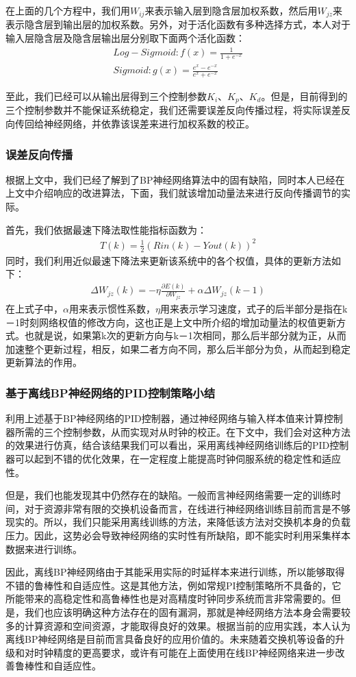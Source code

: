 在上面的几个方程中，我们用$W_{ij}$来表示输入层到隐含层加权系数，然后用$W_{jz}$来表示隐含层到输出层的加权系数。另外，对于活化函数有多种选择方式，本人对于输入层\-隐含层及隐含层\-输出层分别取下面两个活化函数：
\begin{align}
Log-Sigmoid : f(x) = \frac{1}{1 + e^{-x}} \\
Sigmoid : g(x) = \frac{e^{x} - e^{-x}}{e^{x} + e^{-x}}
\end{align}

至此，我们已经可以从输出层得到三个控制参数$K_{i}$、$K_{p}$、$K_{d}$。但是，目前得到的三个控制参数并不能保证系统稳定，我们还需要误差反向传播过程，将实际误差反向传回给神经网络，并依靠该误差来进行加权系数的校正。

\subsubsection{误差反向传播}
根据上文中，我们已经了解到了BP神经网络算法中的固有缺陷，同时本人已经在上文中介绍响应的改进算法，下面，我们就该增加动量法来进行反向传播调节的实际。

首先，我们依据最速下降法取性能指标函数为：
\begin{align}
T(k) = \frac{1}{2}(Rin(k) - Yout(k))^{2}
\end{align}
同时，我们利用近似最速下降法来更新该系统中的各个权值，具体的更新方法如下：
\begin{align}
\Delta W_{jz}(k) = -\eta \frac{\partial E(k)}{\partial W_{jz}} + \alpha \Delta W_{jz}(k-1)
\end{align}
在上式子中，$\alpha$用来表示惯性系数，$\eta$用来表示学习速度，式子的后半部分是指在k－1时刻网络权值的修改方向，这也正是上文中所介绍的增加动量法的权值更新方式。也就是说，如果第k次的更新方向与k－1次相同，那么后半部分就为正，从而加速整个更新过程，相反，如果二者方向不同，那么后半部分为负，从而起到稳定更新算法的作用。

\subsubsection{基于离线BP神经网络的PID控制策略小结}
利用上述基于BP神经网络的PID控制器，通过神经网络与输入样本值来计算控制器所需的三个控制参数，从而实现对从时钟的校正。在下文中，我们会对这种方法的效果进行仿真，结合该结果我们可以看出，采用离线神经网络训练后的PID控制器可以起到不错的优化效果，在一定程度上能提高时钟伺服系统的稳定性和适应性。

但是，我们也能发现其中仍然存在的缺陷。一般而言神经网络需要一定的训练时间，对于资源非常有限的交换机设备而言，在线进行神经网络训练目前而言是不够现实的。所以，我们只能采用离线训练的方法，来降低该方法对交换机本身的负载压力。因此，这势必会导致神经网络的实时性有所缺陷，即不能实时利用采集样本数据来进行训练。

因此，离线BP神经网络由于其能采用实际的时延样本来进行训练，所以能够取得不错的鲁棒性和自适应性。这是其他方法，例如常规PI控制策略所不具备的，它所能带来的高稳定性和高鲁棒性也是对高精度时钟同步系统而言非常需要的。但是，我们也应该明确这种方法存在的固有漏洞，那就是神经网络方法本身会需要较多的计算资源和空间资源，才能取得良好的效果。根据当前的应用实践，本人认为离线BP神经网络是目前而言具备良好的应用价值的。未来随着交换机等设备的升级和对时钟精度的更高要求，或许有可能在上面使用在线BP神经网络来进一步改善鲁棒性和自适应性。







